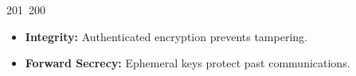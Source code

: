 201~200~\documentclass{article}
\begin{document}
\begin{itemize}
	                                                                                                                                                                                                                                                                                                	                                                                                                                                        	    	                                                                                                	                                                                                                                                                                                                                                                                                                                                	                                                                        	                                                                        	                                                                                                                                        	                                                                                                                                                                                                                        	                                                            \item \textbf{Integrity:} Authenticated encryption prevents tampering.
	                                                                                                                                                                                                                                                                                                	                                                                                                                                        	    	                                                                                                	                                                                                                                                                                                                                                                                                                                                	                                                                        	                                                                        	                                                                                                                                        	                                                                                                                                                                                                                        	                                                                \item \textbf{Forward Secrecy:} Ephemeral keys protect past communications.

\end{itemize}
\end{document}
